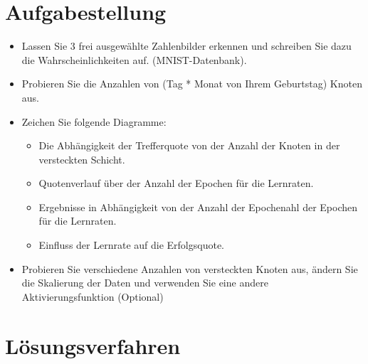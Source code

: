 \section{Aufgabestellung}
\begin{itemize}
    \item Lassen Sie 3 frei ausgewählte Zahlenbilder erkennen und schreiben
          Sie dazu die Wahrscheinlichkeiten auf. (MNIST-Datenbank).
    \item Probieren Sie die Anzahlen von (Tag * Monat von Ihrem
          Geburtstag) Knoten aus.
    \item Zeichen Sie folgende Diagramme:
          \begin{itemize}
              \item Die Abhängigkeit der Trefferquote von der Anzahl der Knoten in der
                    versteckten Schicht.
              \item Quotenverlauf über der Anzahl der Epochen für die Lernraten.
              \item Ergebnisse in Abhängigkeit von der Anzahl der Epochenahl der
                    Epochen für die Lernraten.
              \item Einfluss der Lernrate auf die Erfolgsquote.
          \end{itemize}
    \item Probieren Sie verschiedene Anzahlen von versteckten Knoten
          aus, ändern Sie die Skalierung der Daten und verwenden Sie
          eine andere Aktivierungsfunktion (Optional)
\end{itemize}
\pagebreak

\section{Lösungsverfahren}
